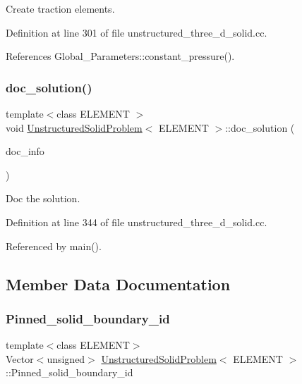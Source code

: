 Create traction elements. 



Definition at line 301 of file unstructured\+\_\+three\+\_\+d\+\_\+solid.\+cc.



References Global\+\_\+\+Parameters\+::constant\+\_\+pressure().

\mbox{\label{classUnstructuredSolidProblem_ab3d66fd61b69d12b4f159d763fc44f15}} 
\subsubsection{\texorpdfstring{doc\+\_\+solution()}{doc\_solution()}}
{\footnotesize\ttfamily template$<$class E\+L\+E\+M\+E\+NT $>$ \\
void \hyperlink{classUnstructuredSolidProblem}{Unstructured\+Solid\+Problem}$<$ E\+L\+E\+M\+E\+NT $>$\+::doc\+\_\+solution (\begin{DoxyParamCaption}\item[{Doc\+Info \&}]{doc\+\_\+info }\end{DoxyParamCaption})}



Doc the solution. 



Definition at line 344 of file unstructured\+\_\+three\+\_\+d\+\_\+solid.\+cc.



Referenced by main().



\subsection{Member Data Documentation}
\mbox{\label{classUnstructuredSolidProblem_a62ea7d593eaac6a3a0f0455c4a3fd805}} 
\subsubsection{\texorpdfstring{Pinned\+\_\+solid\+\_\+boundary\+\_\+id}{Pinned\_solid\_boundary\_id}}
{\footnotesize\ttfamily template$<$class E\+L\+E\+M\+E\+NT$>$ \\
Vector$<$unsigned$>$ \hyperlink{classUnstructuredSolidProblem}{Unstructured\+Solid\+Problem}$<$ E\+L\+E\+M\+E\+NT $>$\+::Pinned\+\_\+solid\+\_\+boundary\+\_\+id\hspace{0.3cm}{\ttfamily [private]}}



